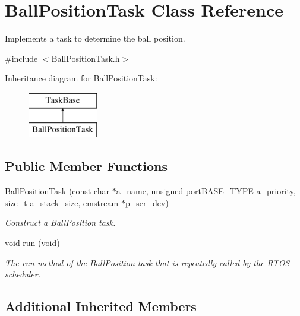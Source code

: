 \hypertarget{class_ball_position_task}{}\section{Ball\+Position\+Task Class Reference}
\label{class_ball_position_task}


Implements a task to determine the ball position.  




{\ttfamily \#include $<$Ball\+Position\+Task.\+h$>$}

Inheritance diagram for Ball\+Position\+Task\+:\begin{figure}[H]
\begin{center}
\leavevmode
\includegraphics[height=2.000000cm]{class_ball_position_task}
\end{center}
\end{figure}
\subsection*{Public Member Functions}
\begin{DoxyCompactItemize}
\item 
\mbox{\hyperlink{class_ball_position_task_a4c6a431cab2bb0ed34445bfd79ba7dd5}{Ball\+Position\+Task}} (const char $\ast$a\+\_\+name, unsigned port\+B\+A\+S\+E\+\_\+\+T\+Y\+PE a\+\_\+priority, size\+\_\+t a\+\_\+stack\+\_\+size, \mbox{\hyperlink{classemstream}{emstream}} $\ast$p\+\_\+ser\+\_\+dev)
\begin{DoxyCompactList}\small\item\em Construct a Ball\+Position task. \end{DoxyCompactList}\item 
void \mbox{\hyperlink{class_ball_position_task_aa48c00fc26b05fe4f3c0cc8eed70fce4}{run}} (void)
\begin{DoxyCompactList}\small\item\em The run method of the Ball\+Position task that is repeatedly called by the R\+T\+OS scheduler. \end{DoxyCompactList}\end{DoxyCompactItemize}
\subsection*{Additional Inherited Members}


